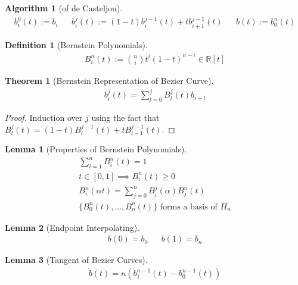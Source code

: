 \documentclass[conference]{IEEEtran}
\newtheorem{algorithm}{Algorithm}
\newtheorem{definition}{Definition}
\newtheorem{lemma}{Lemma}
\newtheorem{theorem}{Theorem}
\begin{document}
\begin{algorithm}[of de Casteljou]
	\begin{align*}
		b_i^0(t):= b_i && b_i^j(t) := (1-t)b_i^{j-1}(t) + t b_{i+1}^{j-1}(t) && b(t) := b_0^n(t)
	\end{align*}
\end{algorithm}

\begin{definition}[Bernstein Polynomials]
	\begin{align*}
		B_i^n(t) := \binom{n}{i} t^i (1-t)^{n-i} \in \mathbb{R}[t]
	\end{align*}
\end{definition}

\begin{theorem}[Bernstein Representation of Bezier Curve]
	\begin{align*}
		b_i^j(t) = \sum_{l=0}^{j} B_l^j(t) b_{i+l}
	\end{align*}
\end{theorem}

\begin{proof}
	Induction over $j$ using the fact that\\
	$B_l^j(t) = (1-t)B_l^{j-1}(t) + t B_{l-1}^{j-1}(t)$.
\end{proof}

\begin{lemma}[Properties of Bernstein Polynomials]
	\begin{align*}
		\sum_{i=1}^{n} B_i^n(t) = 1\\
		t \in [0, 1] \implies B_i^n(t) \geq 0\\
		B_i^n(\alpha t) = \sum_{j=0}^{n} B_i^j(\alpha) B_j^n(t)\\
		\{B_0^n(t), ..., B_n^n(t)\} \text{ forms a basis of } \Pi_n
	\end{align*}
\end{lemma}


\begin{lemma}[Endpoint Interpolating]
	\begin{align*}
		b(0) = b_0 && b(1) = b_n
	\end{align*}
\end{lemma}

\begin{lemma}[Tangent of Bezier Curves]
	\begin{align*}
		\dot{b}(t) = n(b_1^{n-1}(t) - b_0^{n-1}(t))
	\end{align*}
\end{lemma}
\end{document}
